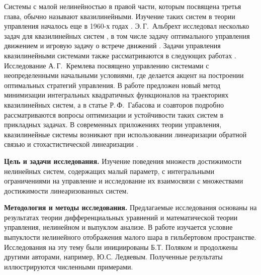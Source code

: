 \documentclass[../main.tex]{subfiles}
\begin{document}
Системы с малой нелинейностью в правой части, которым посвящена третья глава, обычно называют квазилинейными. 
Изучение таких систем в теории управления началось еще в 1960-х годах \cite{Subbotin, Kiselev, Kras_book}.
Э.\,Г.~Альбрехт исследовал несколько задач для квазилинейных систем \cite{Albrecht3}, в том числе задачу оптимального управления движением \cite{Albrecht1} и игровую задачу о встрече движений \cite{Albrecht2}.
Задачи управления квазилинейными системами также рассматриваются в следующих работах \cite{Dauer, Kremlev, KalininLavrinovich2018, Gabasov}.
Исследование А.\,Г.~Кремлева \cite{Kremlev} посвящено управлению системами с неопределенными начальными условиями, где делается акцент на построении оптимальных стратегий управления.
В работе \cite{KalininLavrinovich2018} предложен новый метод минимизации интегральных квадратичных функционалов на траекториях квазилинейных систем, а в статье Р.\,Ф.~Габасова и соавторов \cite{Gabasov} подробно рассматриваются вопросы оптимизации и устойчивости таких систем в прикладных задачах.
В современных приложениях теории управления, квазилинейные системы возникают при использовании линеаризации обратной связью и стохастистической линеаризации \cite{Ching, Gui}.

\textbf{Цель и задачи исследования.} Изучение поведения множеств достижимости нелинейных систем, содержащих малый параметр, с интегральными ограничениями на управление и исследование их взаимосвязи с множествами достижимости линеаризованных систем.

\textbf{Методология и методы исследования.} Предлагаемые исследования основаны на результатах теории дифференциальных уравнений и математической теории управления, нелинейном и выпуклом анализе.
В работе изучается условие выпуклости нелинейного отображения малого шара в гильбертовом пространстве.
Исследования на эту тему были инициированы Б.Т. Поляком\cite{Polyak2001} и продолжены другими авторами, например, Ю.С. Ледяевым\cite{Ledyaev}.
Полученные результаты иллюстрируются численными примерами.
\end{document}
